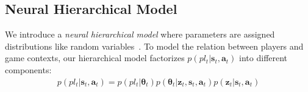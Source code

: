 \documentclass{article}
\newcommand{\latentvariables}{\mathbf{z}}
\newcommand{\generation}{p}
\newcommand{\state}{\mathbf{s}}
\newcommand{\action}{\mathbf{a}}
\newcommand{\player}{pl}
\newcommand{\pindex}{i}
\newcommand{\GaussianParameters}{\boldsymbol{\omega}}
\newcommand{\BernoulliParameters}{\theta}
\begin{document}
\subsection{Neural Hierarchical Model}

We introduce a {\em neural hierarchical model} where parameters are assigned distributions like random variables~\cite{McCallum1998,kruschke2014doing}. 
To model the
relation between players and game contexts, our hierarchical model factorizes $ \generation(\player_{t}|\state_{t},\action_{t})$ into different components:
\vspace{-0.01in}
\begin{align} \label{eq:generate}
\generation(\player_{t}|\state_{t},\action_{t}) = 
\generation(\player_{t}|\boldsymbol{\BernoulliParameters}_{t})
\generation(\boldsymbol{\BernoulliParameters}_{t}|\latentvariables_{t},\state_{t},\action_{t})
\generation(\latentvariables_{t}|\state_{t},\action_{t})
\end{align}
\vspace{-0.05in}
\end{document}
